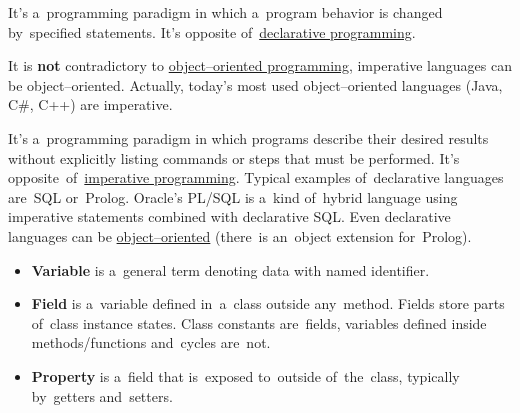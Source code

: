 





\label{imperativeprogramming}
It's a~programming paradigm in which a~program behavior is changed by~specified statements. It's opposite of~\hyperref[declarativeprogramming]{declarative programming}.

\warning It is \textbf{not} contradictory to \hyperref[objectorientedprogramming]{object--oriented programming}, imperative languages can be object--oriented. Actually, today's most used object--oriented languages (Java, C\#, C++) are imperative.

\label{declarativeprogramming}
It's a~programming paradigm in which programs describe their desired results without explicitly listing commands or steps that must be performed. It's opposite~of~\hyperref[imperativeprogramming]{imperative programming}. Typical examples of~declarative languages are~SQL or~Prolog. Oracle's PL/SQL is a~kind of~hybrid language using imperative statements combined with declarative SQL. Even declarative languages can be \hyperref[objectorientedprogramming]{object--oriented} (there~is an~object extension for~Prolog).

\label{compiledinterpretedlanguages}

\label{variablefieldproperty}
\begin{itemize}
    \item \textbf{Variable} is a~general term denoting data with named identifier.
    \item \textbf{Field} is a~variable defined in~a~class outside any~method. Fields store parts of~class instance states. Class constants are~fields, variables defined inside \mbox{methods/functions} and~cycles are~not.
    \item \textbf{Property} is a~field that is~exposed to~outside of~the~class, typically by~getters and~setters.
\end{itemize}

